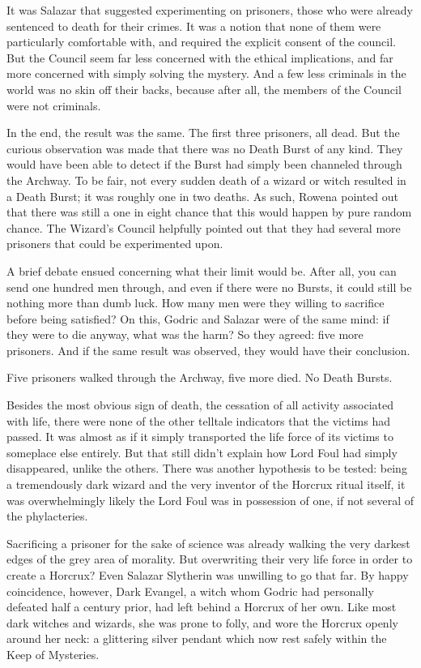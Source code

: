 It was Salazar that suggested experimenting on prisoners, those who were already sentenced to death for their crimes. It was a notion that none of them were particularly comfortable with, and required the explicit consent of the council. But the Council seem far less concerned with the ethical implications, and far more concerned with simply solving the mystery. And a few less criminals in the world was no skin off their backs, because after all, the members of the Council were not criminals.

In the end, the result was the same. The first three prisoners, all dead. But the  curious observation was made that there was no Death Burst of any kind. They would have been able to detect if the Burst had simply been channeled through the Archway. To be fair, not every sudden death of a wizard or witch resulted in a Death Burst; it was roughly one in two deaths. As such, Rowena pointed out that there was still a one in eight chance that this would happen by pure random chance. The Wizard’s Council helpfully pointed out that they had several more prisoners that could be experimented upon.

A brief debate ensued concerning what their limit would be. After all, you can send one hundred men through, and even if there were no Bursts, it could still be nothing more than dumb luck. How many men were they willing to sacrifice before being satisfied? On this, Godric and Salazar were of the same mind: if they were to die anyway, what was the harm? So they agreed: five more prisoners. And if the same result was observed, they would have their conclusion.

Five prisoners walked through the Archway, five more died. No Death Bursts.

Besides the most obvious sign of death, the cessation of all activity associated with life, there were none of the other telltale indicators that the victims had passed. It was almost as if it simply transported the life force of its victims to someplace else entirely. But that still didn’t explain how Lord Foul had simply disappeared, unlike the others. There was another hypothesis to be tested: being a tremendously dark wizard and the very inventor of the Horcrux ritual itself, it was overwhelmingly likely the Lord Foul was in possession of one, if not several of the phylacteries.

Sacrificing a prisoner for the sake of science was already walking the very darkest edges of the grey area of morality. But overwriting their very life force in order to create a Horcrux? Even Salazar Slytherin was unwilling to go that far. By happy coincidence, however, Dark Evangel, a witch whom Godric had personally defeated half a century prior, had left behind a Horcrux of her own. Like most dark witches and wizards, she was prone to folly, and wore the Horcrux openly around her neck: a glittering silver pendant which now rest safely within the Keep of Mysteries.

